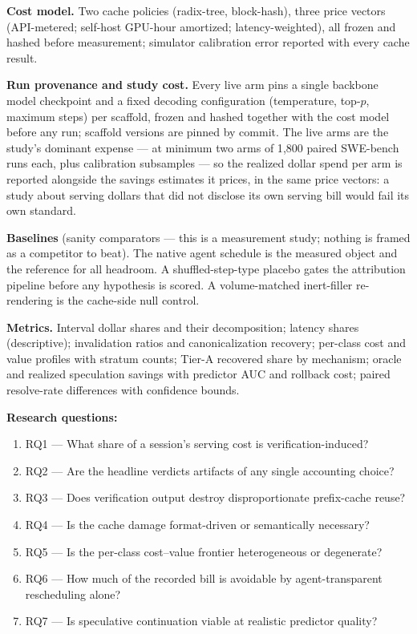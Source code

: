 \documentclass[11pt]{article}
\begin{document}
\textbf{Cost model.} Two cache policies (radix-tree, block-hash), three price vectors (API-metered; self-host GPU-hour amortized; latency-weighted), all frozen and hashed before measurement; simulator calibration error reported with every cache result.

\textbf{Run provenance and study cost.} Every live arm pins a single backbone model checkpoint and a fixed decoding configuration (temperature, top-$p$, maximum steps) per scaffold, frozen and hashed together with the cost model before any run; scaffold versions are pinned by commit. The live arms are the study's dominant expense --- at minimum two arms of 1{,}800 paired SWE-bench runs each, plus calibration subsamples --- so the realized dollar spend per arm is reported alongside the savings estimates it prices, in the same price vectors: a study about serving dollars that did not disclose its own serving bill would fail its own standard.

\textbf{Baselines} (sanity comparators --- this is a measurement study; nothing is framed as a competitor to beat). The native agent schedule is the measured object and the reference for all headroom. A shuffled-step-type placebo gates the attribution pipeline before any hypothesis is scored. A volume-matched inert-filler re-rendering is the cache-side null control.

\textbf{Metrics.} Interval dollar shares and their decomposition; latency shares (descriptive); invalidation ratios and canonicalization recovery; per-class cost and value profiles with stratum counts; Tier-A recovered share by mechanism; oracle and realized speculation savings with predictor AUC and rollback cost; paired resolve-rate differences with confidence bounds.

\textbf{Research questions:}
\begin{enumerate}[leftmargin=2em]
  \item RQ1 --- What share of a session's serving cost is verification-induced?
  \item RQ2 --- Are the headline verdicts artifacts of any single accounting choice?
  \item RQ3 --- Does verification output destroy disproportionate prefix-cache reuse?
  \item RQ4 --- Is the cache damage format-driven or semantically necessary?
  \item RQ5 --- Is the per-class cost--value frontier heterogeneous or degenerate?
  \item RQ6 --- How much of the recorded bill is avoidable by agent-transparent rescheduling alone?
  \item RQ7 --- Is speculative continuation viable at realistic predictor quality?
\end{enumerate}
\end{document}
